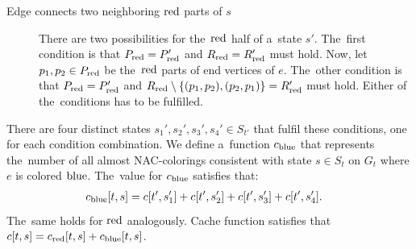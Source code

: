 \begin{lemma}
\begin{description}
		\item[Edge connects two neighboring \( \text{red} \) parts of \( s \)]
		      There are two possibilities for the~\( \text{red} \) half of a~state \( s' \).
		      The~first condition is that \( P_{\text{red}} = P_{\text{red}}' \)
		      and \( R_{\text{red}} = R_{\text{red}}' \) must hold.
		      Now, let \( p_1, p_2 \in P_{\text{red}} \) be the~\( \text{red} \) parts
		      of end vertices of \( e \).
		      The~other condition is that \( P_{\text{red}} = P_{\text{red}}' \) and
		      \( R_{\text{red}} \setminus \{(p_{1}, p_{2}), (p_{2}, p_{1})\} = R_{\text{red}}' \) must hold.
		      Either of the~conditions has to be fulfilled.

	\end{description}
	There are four distinct states \( s_1', s_2', s_3', s_4' \in S_{t'} \)
	that fulfil these conditions, one for each condition combination.
	We define a~function \( c_{\text{blue}} \) that represents
	the~number of all almost NAC-colorings
	consistent with state \( s \in S_t \) on \( G_t \)
	where \( e \) is colored \( \text{blue} \).
	The~value for \( c_{\text{blue}} \) satisfies that:
	\begin{align*}
		c_{\text{blue}}[t, s] & = c[t', s_1'] + c[t', s_2'] + c[t', s_3'] + c[t', s_4'].
	\end{align*}
	The~same holds for \( \text{red} \) analogously.
	Cache function satisfies that  \( c[t, s] = c_{\text{red}}[t, s] + c_{\text{blue}}[t, s] \).
\end{lemma}
%
